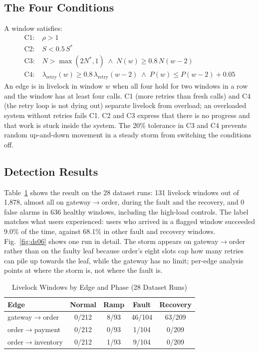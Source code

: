 \documentclass[conference,a4paper]{IEEEtran}
\begin{document}
\subsection{The Four Conditions}
A window satisfies:
\begin{align}
\text{C1:}\;& \rho > 1 \label{eq:c1}\\
\text{C2:}\;& S < 0.5\, S^\ast \\
\text{C3:}\;& N > \max(2N^\ast, 1) \;\wedge\; N(w) \ge 0.8\, N(w-2) \\
\text{C4:}\;& \lambda_{\text{retry}}(w) \ge 0.8\,\lambda_{\text{retry}}(w-2) \;\wedge\; P(w) \le P(w-2) + 0.05 \label{eq:c4}
\end{align}
An edge is in livelock in window $w$ when all four hold for two windows in a row and the window has at least four calls. C1 (more retries than fresh calls) and C4 (the retry loop is not dying out) separate livelock from overload; an overloaded system without retries fails C1. C2 and C3 express that there is no progress and that work is stuck inside the system. The 20\% tolerance in C3 and C4 prevents random up-and-down movement in a steady storm from switching the conditions off.

\subsection{Detection Results}
Table~\ref{tab:detect} shows the result on the 28 dataset runs: 131 livelock windows out of 1,878, almost all on gateway$\to$order, during the fault and the recovery, and 0 false alarms in 636 healthy windows, including the high-load controls. The label matches what users experienced: users who arrived in a flagged window succeeded 9.0\% of the time, against 68.1\% in other fault and recovery windows. Fig.~\ref{fig:ds06} shows one run in detail. The storm appears on gateway$\to$order rather than on the faulty leaf because order's eight slots cap how many retries can pile up towards the leaf, while the gateway has no limit; per-edge analysis points at where the storm is, not where the fault is.

\begin{table}[!t]
\caption{Livelock Windows by Edge and Phase (28 Dataset Runs)}
\label{tab:detect}
\centering
\small
\begin{tabular}{|l|c|c|c|c|}
\hline
\textbf{Edge} & \textbf{Normal} & \textbf{Ramp} & \textbf{Fault} & \textbf{Recovery} \\ \hline
gateway$\to$order & 0/212 & 8/93 & 46/104 & 63/209 \\ \hline
order$\to$payment & 0/212 & 0/93 & 1/104 & 0/209 \\ \hline
order$\to$inventory & 0/212 & 1/93 & 9/104 & 0/209 \\ \hline
\end{tabular}
\end{table}
\end{document}

